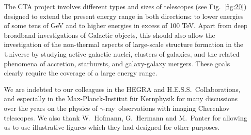 \documentclass{svjour3x}                     %
\newcommand{\gr}{$\gamma$-ray}
\newcommand{\hess}{H.E.S.S.}
\begin{document}
The CTA project involves different types and sizes of telescopes (see
Fig.~\ref{fig:20}) designed to extend the present energy range in both
directions: to lower energies of some tens of GeV and to higher energies in
excess of 100 TeV. Apart from deep broadband investigations of Galactic
objects, this should also allow the investigation of the non-thermal aspects of
large-scale structure formation in the Universe by studying active galactic
nuclei, clusters of galaxies, and the related phenomena of accretion,
starbursts, and galaxy-galaxy mergers. These goals clearly require the coverage
of a large energy range.

\begin{acknowledgements}
  We are indebted to our colleagues in the HEGRA and \hess\ Collaborations, and
  especially in the Max-Planck-Institut f\"ur Kernphysik for many discussions
  over the years on the physics of \gr\ observations with imaging Cherenkov
  telescopes. We also thank W.~Hofmann, G.~Hermann and M.~Panter for allowing
  us to use illustrative figures which they had designed for other purposes.
\end{acknowledgements}
\end{document}
